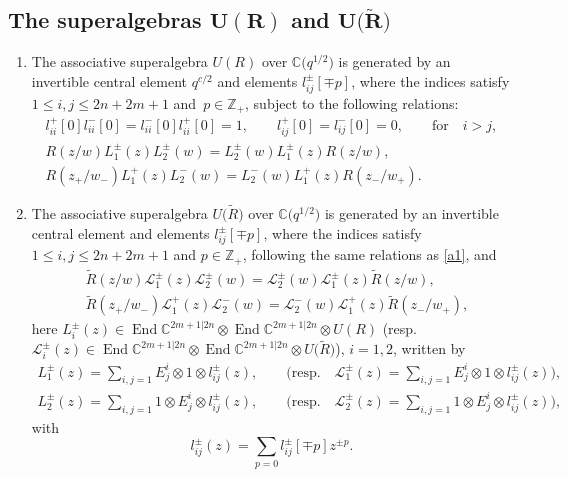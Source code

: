 \documentclass[pdftex]{sigma}
\numberwithin{equation}{section}
\begin{document}
\subsection[The superalgebras U(R) and U(R)]{The superalgebras $\boldsymbol{U(R)}$ and $\boldsymbol{U\bigl(\widetilde{R}\bigr)}$ }


\begin{Definition}\quad
\begin{enumerate}\itemsep=0pt
\item[(1)] The associative superalgebra $U(R)$ over $\mathbb{C}\bigl(q^{1/2}\bigr)$ is generated by an invertible central element $q^{c/2}$ and elements $l_{ij}^{\pm}[\mp p]$, where the indices satisfy $ 1\leq i,j\leq2n+2m+1$ and~${p\in\mathbb{Z}_+}$,
 subject to the following relations:
\begin{gather}%
 l^+_{ii}[0]l^-_{ii}[0]=l^-_{ii}[0] l^+_{ii}[0]=1, \qquad l^+_{ij}[0]=l^-_{ij}[0]=0,\qquad \text{for} \quad i>j,\nonumber\\
 R(z/w)L_1^{\pm}(z)L_2^{\pm}(w)=L_2^{\pm}(w)L_1^{\pm}(z) R(z/w),\nonumber\\
 R(z_+/w_-)L_1^{+}(z)L_2^{-}(w)=L_2^{-}(w)L_1^{+}(z) R(z_-/w_+).\label{a1}
\end{gather}
\item[(2)] The associative superalgebra $U\bigl(\widetilde{R}\bigr)$ over $\mathbb{C}\bigl(q^{1/2}\bigr)$ is generated by an invertible central element  and elements $l_{ij}^{\pm}[\mp p]$, where the indices satisfy $ 1\leq i,j\leq2n+2m+1$ and {$p\in\mathbb{Z}_+$,}
 following the same relations as \eqref{a1}, and
\begin{align}
 \label{d2}
 &\widetilde{R}(z/w)\mathcal{L}_1^{\pm}(z)\mathcal{L}_2^{\pm}(w)=\mathcal{L}_2^{\pm}(w)\mathcal{L}_1^{\pm}(z) \widetilde{R}(z/w),\\
 \label{d3}
 &\widetilde{R}(z_+/w_-)\mathcal{L}_1^{+}(z)\mathcal{L}_2^{-}(w)=\mathcal{L}_2^{-}(w)\mathcal{L}_1^{+}(z) \widetilde{R}(z_-/w_+),
\end{align}
here $L_i^{\pm}(z)\in \operatorname{End} \mathbb{C}^{2m+1|2n}\otimes \operatorname{End} \mathbb{C}^{2m+1|2n}\otimes
 U(R)$ \big(resp.\ $\mathcal{L}_i^{\pm}(z)\in \operatorname{End} \mathbb{C}^{2m+1|2n}\otimes \operatorname{End} \mathbb{C}^{2m+1|2n}\allowbreak\otimes
 U\bigl(\widetilde{R}\bigr)$\big), $i=1,2$, written by
\begin{gather*}
 L_1^{\pm}(z)=\sum\limits_{i,j=1}E^i_j\otimes1\otimes l_{ij}^{\pm}(z),\qquad \biggl(\text{resp}.\quad \mathcal{L}_1^{\pm}(z)=\sum\limits_{i,j=1}E^i_j\otimes1\otimes l_{ij}^{\pm}(z)\biggr), \\
 L_2^{\pm}(z)=\sum\limits_{i,j=1}1\otimes E^i_j\otimes l_{ij}^{\pm}(z), \qquad \biggl(\text{resp}.\quad \mathcal{L}_2^{\pm}(z)=\sum\limits_{i,j=1}1\otimes E^i_j\otimes l_{ij}^{\pm}(z)\biggr),
\end{gather*}
with
\begin{equation*}
 l_{ij}^{\pm}(z)=\sum\limits_{p=0}l_{ij}^{\pm}[\mp p]z^{\pm p}.
\end{equation*}
\end{enumerate}
\end{Definition}
\end{document}
